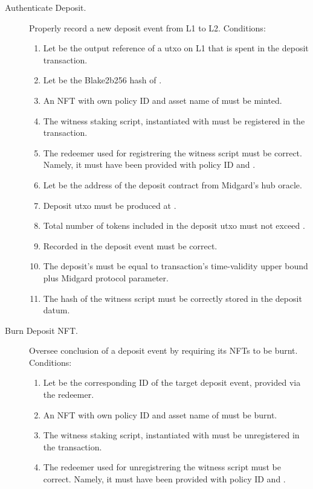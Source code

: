 \documentclass[../midgard.tex]{subfiles}
\begin{document}
\begin{description}
  \item[Authenticate Deposit.] Properly record a new deposit event from L1 to L2.
    Conditions:
      \begin{enumerate}
        \item Let  be the output reference of a utxo on L1 that is spent in the deposit transaction.
        \item Let  be the Blake2b256 hash of .
        \item An NFT with own policy ID and asset name of  must be minted.
        \item The witness staking script, instantiated with  must be registered in the transaction.
        \item The redeemer used for registrering the witness script must be correct. Namely, it must have been provided with  policy ID and .
        \item Let  be the address of the deposit contract from Midgard's hub oracle.
        \item Deposit utxo must be produced at .
        \item Total number of tokens included in the deposit utxo must not exceed .
        \item Recorded  in the deposit event must be correct.
        \item The deposit's  must be equal to transaction's time-validity upper bound plus  Midgard protocol parameter.
        \item The hash of the witness script must be correctly stored in the deposit datum.
      \end{enumerate}
  \item[Burn Deposit NFT.] Oversee conclusion of a deposit event by requiring its NFTs to be burnt.
    Conditions:
      \begin{enumerate}
        \item Let  be the corresponding ID of the target deposit event, provided via the redeemer.
        \item An NFT with own policy ID and asset name of  must be burnt.
        \item The witness staking script, instantiated with  must be unregistered in the transaction.
        \item The redeemer used for unregistrering the witness script must be correct. Namely, it must have been provided with  policy ID and .
      \end{enumerate}
\end{description}
\end{document}
